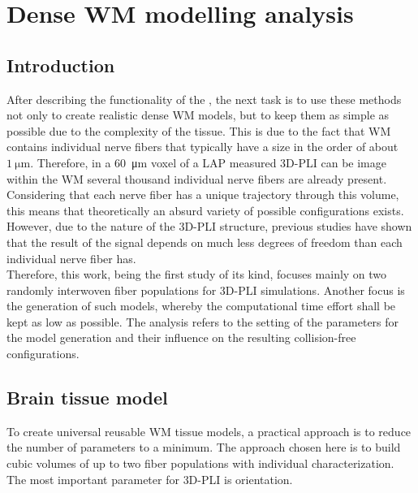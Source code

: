 \setcounter{chapter}{6}
\chapter{Dense \acs{WM} modelling analysis}
\label{cha:model_analysis}
% 
% 
% 
% 
\section{Introduction}
% 
After describing the functionality of the , the next task is to use these methods not only to create realistic dense \ac{WM} models, but to keep them as simple as possible due to the complexity of the tissue.
This is due to the fact that \ac{WM} contains individual nerve fibers that typically have a size in the order of about $\SI{1}{\micro\meter}$.
Therefore, in a \SI{60}{\micro\meter} voxel of a \ac{LAP} measured \ac{3D-PLI} can be image within the \ac{WM} several thousand individual nerve fibers are already present.
Considering that each nerve fiber has a unique trajectory through this volume, this means that theoretically an absurd variety of possible configurations exists.
However, due to the nature of the \ac{3D-PLI} structure, previous studies have shown that the result of the signal depends on much less degrees of freedom than each individual nerve fiber has.
\\[\baselineskip]
% 
Therefore, this work, being the first study of its kind, focuses mainly on two randomly interwoven fiber populations for \ac{3D-PLI} simulations.
Another focus is the generation of such models, whereby the computational time effort shall be kept as low as possible.
The analysis refers to the setting of the parameters for the model generation and their influence on the resulting collision-free configurations.
% 
% 
\section{Brain tissue model}
% 
To create universal reusable \ac{WM} tissue models, a practical approach is to reduce the number of parameters to a minimum.
The approach chosen here is to build cubic volumes of up to two fiber populations with individual characterization.
The most important parameter for \ac{3D-PLI} is orientation.
% 
